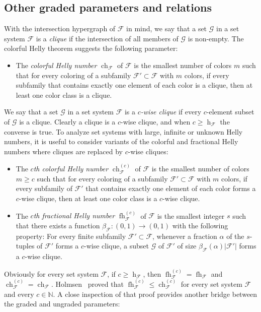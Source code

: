 \documentclass[a4paper,UKenglish,thm-restate]{article}
\newcommand{\N}{\mathbb{N}}
\newcommand{\F}{\mathcal{F}}
\newcommand{\G}{\mathcal{G}}
\DeclareMathOperator{\h}{h}
\DeclareMathOperator{\ch}{ch}
\DeclareMathOperator{\fh}{fh}
\newcommand{\defn}[1]{\emph{\color{violet}#1}}
\begin{document}
\subsection{Other graded parameters and relations}\label{s:graded2}

With the intersection hypergraph of $\F$ in mind, we say that a set $\G$ in a set system $\F$ is a \defn{clique} if the intersection of all members of $\G$ is non-empty. The colorful Helly theorem suggests the following parameter:

\begin{itemize}
\item The \defn{colorful Helly number} $\ch_\F$ of $\F$ is the smallest number of colors $m$ such that for every coloring of a subfamily $\F'\subset \F$ with $m$ colors, if every subfamily that contains exactly one element of each color is a clique, then at least one color class is a clique.
\end{itemize}

\noindent
We say that a set $\G$ in a set system $\F$ is a \defn{$c$-wise clique} if every $c$-element subset of $\G$ is a clique. Clearly a clique is a $c$-wise clique, and when $c \ge \h_\F$ the converse is true. To analyze  set systems with large, infinite or unknown Helly numbers, it is useful to consider variants of the colorful and fractional Helly numbers where cliques are replaced by $c$-wise cliques:

\begin{itemize}
\item The \defn{$c$th colorful Helly number} $\ch^{(c)}_\F$ of $\F$ is the smallest number of colors $m \geq c$ such that for every coloring of a subfamily $\F'\subset \F$ with $m$ colors, if every subfamily of $\F'$ that contains exactly one element of each color forms a $c$-wise clique, then at least one color class is a $c$-wise clique.\medskip
 
\item The \defn{$c$th fractional Helly number} $\fh^{(c)}_\F$ of $\F$ is the smallest integer $s$ such that there exists a function $\beta_\F:(0,1)\rightarrow (0,1)$ with the following property: For every finite subfamily $\F'\subset \F$, whenever a fraction $\alpha$ of the $s$-tuples of $\F'$ forms a $c$-wise clique, a subset $\G$ of $\F'$ of size $\beta_\F(\alpha)|\F'|$ forms a $c$-wise clique. \medskip
\end{itemize}

\noindent
Obviously for every set system $\F$, if $c \ge \h_\F$, then $\fh^{(c)}_\F = \fh_\F$ and $\ch^{(c)}_\F = \ch_\F$. Holmsen~\cite[Theorem~1.2]{Holmsen2020} proved that $\fh^{(c)}_\F\leq \ch^{(c)}_\F$ for every set system $\F$ and every $c\in\N$. A close inspection of that proof provides another bridge between the graded and ungraded parameters:
%
\end{document}
